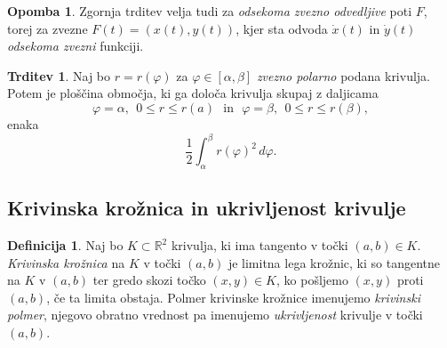 \documentclass[11pt]{article}
\newcommand{\R}{\mathbb{R}}
\theoremstyle{definition}
\newtheorem{definicija}{Definicija}[section]
\theoremstyle{definition}
\newtheorem{trditev}{Trditev}[section]
\theoremstyle{definition}
\theoremstyle{theorem}
\newtheorem*{opomba}{Opomba}
\begin{document}
\begin{opomba}

Zgornja trditev velja tudi za \textit{odsekoma zvezno odvedljive} poti $F$, torej za zvezne $F(t) = (x(t), y(t))$, kjer sta odvoda $\dot{x}(t)$ in $\dot{y}(t)$ \textit{odsekoma zvezni} funkciji.

\end{opomba}
\vspace{0.5cm}

\begin{trditev}

Naj bo $r = r(\varphi)$ za $\varphi \in [\alpha, \beta]$ \textit{zvezno polarno} podana krivulja. Potem je ploščina območja, ki ga določa krivulja skupaj z daljicama 
$$\varphi = \alpha, ~~0 \leq r \leq r(a) ~~~\text{in}~~~ \varphi = \beta, ~~0 \leq r \leq r(\beta),$$
enaka
$$\frac{1}{2} \int_\alpha^\beta r(\varphi)^2\,d\varphi.$$

\end{trditev}
\vspace{0.5cm}


\subsection{Krivinska krožnica in ukrivljenost krivulje}
\vspace{0.5cm}

\begin{definicija}

Naj bo $K \subset \R^2$ krivulja, ki ima tangento v točki $(a, b) \in K$. \textit{Krivinska krožnica} na $K$ v točki $(a, b)$ je limitna lega krožnic, ki so tangentne na $K$ v $(a, b)$ ter gredo skozi točko $(x, y) \in K$, ko pošljemo $(x, y)$ proti $(a, b)$, če ta limita obstaja. Polmer krivinske krožnice imenujemo \textit{krivinski polmer}, njegovo obratno vrednost pa imenujemo \textit{ukrivljenost} krivulje v točki $(a, b)$.

\end{definicija}
\vspace{0.5cm}
\end{document}
